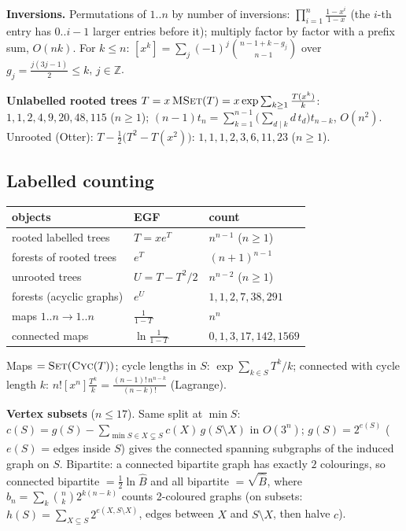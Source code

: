	\textbf{Inversions.} Permutations of $1..n$ by number of inversions: $\prod_{i=1}^n\frac{1-x^i}{1-x}$ (the $i$-th entry has $0..i-1$ larger entries before it); multiply factor by factor with a prefix sum, $O(nk)$. For $k\le n$: $[x^k]=\sum_j(-1)^j\binom{n-1+k-g_j}{n-1}$ over $g_j=\frac{j(3j-1)}2\le k$, $j\in\mathbb Z$.

	\textbf{Unlabelled rooted trees} $T=x\,\textsc{MSet}(T)=x\exp\sum_{k\ge1}\frac{T(x^k)}k$: $1,1,2,4,9,20,48,115$ ($n\ge1$); $(n-1)t_n=\sum_{k=1}^{n-1}\big(\sum_{d\mid k}d\,t_d\big)t_{n-k}$, $O(n^2)$. Unrooted (Otter): $T-\frac12\big(T^2-T(x^2)\big)$: $1,1,1,2,3,6,11,23$ ($n\ge1$).

	\subsection{Labelled counting}
	\begin{center}\small\renewcommand{\arraystretch}{1.3}
	\begin{tabular}{@{}L{3.3cm}@{\ \ }l@{\ \ }l@{}}
	objects & EGF & count \\ \hline
	rooted labelled trees & $T=xe^T$ & $n^{n-1}$ ($n\ge1$) \\
	forests of rooted trees & $e^T$ & $(n+1)^{n-1}$ \\
	unrooted trees & $U=T-T^2/2$ & $n^{n-2}$ ($n\ge1$) \\
	forests (acyclic graphs) & $e^U$ & $1,1,2,7,38,291$ \\
	maps $1..n\to1..n$ & $\frac1{1-T}$ & $n^n$ \\
	connected maps & $\ln\frac1{1-T}$ & $0,1,3,17,142,1569$ \\
	\end{tabular}
	\end{center}
	Maps $=\textsc{Set}(\textsc{Cyc}(T))$; cycle lengths in $S$: $\exp\sum_{k\in S}T^k/k$; connected with cycle length $k$: $n![x^n]\frac{T^k}k=\frac{(n-1)!\,n^{n-k}}{(n-k)!}$ (Lagrange).

	\textbf{Vertex subsets} ($n\le17$). Same split at $\min S$: $c(S)=g(S)-\sum_{\min S\in X\subsetneq S}c(X)\,g(S\setminus X)$ in $O(3^n)$; $g(S)=2^{e(S)}$ ($e(S)$ = edges inside $S$) gives the connected spanning subgraphs of the induced graph on $S$. Bipartite: a connected bipartite graph has exactly $2$ colourings, so connected bipartite $=\frac12\ln\hat B$ and all bipartite $=\sqrt{\hat B}$, where $b_n=\sum_k\binom nk2^{k(n-k)}$ counts 2-coloured graphs (on subsets: $h(S)=\sum_{X\subseteq S}2^{e(X,S\setminus X)}$, edges between $X$ and $S\setminus X$, then halve $c$).

